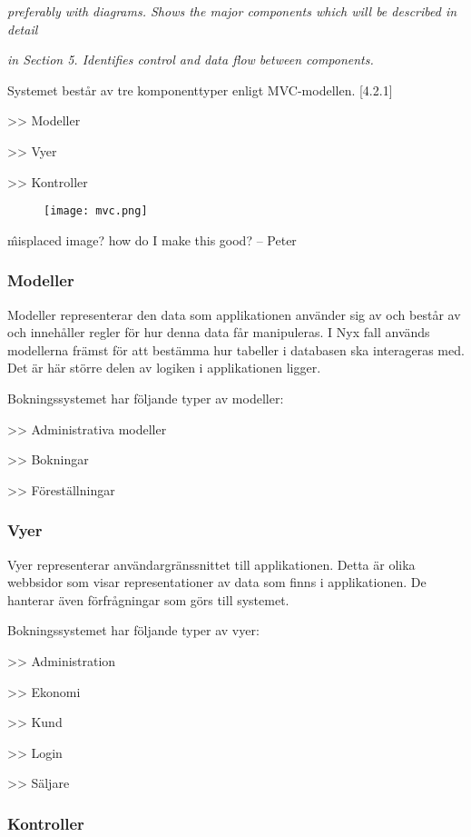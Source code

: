 \documentclass[a4paper, twoside, 11pt, titlepage]{article}
\begin{document}
	\emph{preferably with diagrams. Shows the major components which will be described in detail}

	\emph{in Section 5. Identifies control and data flow between components.}

	Systemet består av tre komponenttyper enligt MVC-modellen. [4.2.1]

	>> Modeller

	>> Vyer

	>> Kontroller

	\begin{figure}[ht] \centering \texttt{[image: mvc.png]} \end{figure} \FloatBarrier

	\^ misplaced image? how do I make this good? -- Peter

		\subsubsection{Modeller}


		Modeller representerar den data som applikationen använder sig av och består av och innehåller regler för hur denna data får manipuleras. I Nyx fall används modellerna främst för att bestämma hur tabeller i databasen ska interageras med. Det är här större delen av logiken i applikationen ligger.

		Bokningssystemet har följande typer av modeller:

		>> Administrativa modeller

		>> Bokningar

		>> Föreställningar

		\subsubsection{Vyer}


		Vyer representerar användargränssnittet till applikationen. Detta är olika webbsidor som visar representationer av data som finns i applikationen. De hanterar även förfrågningar som görs till systemet.

		Bokningssystemet har följande typer av vyer:

		>> Administration

		>> Ekonomi

		>> Kund

		>> Login

		>> Säljare

		\subsubsection{Kontroller}
\end{document}
